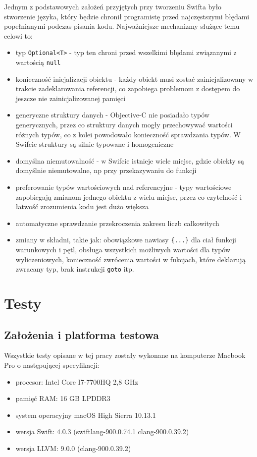 \documentclass[mgr, shortabstract]{iithesis}
\begin{document}
Jednym z podstawowych założeń przyjętych przy tworzeniu Swifta było stworzenie języka, który będzie chronił programistę przed najczęstszymi błędami popełnianymi podczas pisania kodu. Najważniejsze mechanizmy służące temu celowi to:

\begin{itemize}
    \item typ \texttt{Optional<T>} - typ ten chroni przed wszelkimi błędami związanymi z wartością \texttt{null}
    \item konieczność inicjalizacji obiektu - każdy obiekt musi zostać zainicjalizowany w trakcie zadeklarowania referencji, co zapobiega problemom z dostępem do jeszcze nie zainicjalizowanej pamięci
    \item generyczne struktury danych - Objective-C nie posiadało typów generycznych, przez co struktury danych mogły przechowywać wartości różnych typów, co z kolei powodowało konieczność sprawdzania typów. W Swifcie struktury są silnie typowane i homogeniczne
    \item domyślna niemutowalność - w Swifcie istnieje wiele miejsc, gdzie obiekty są domyślnie niemutowalne, np przy przekazywaniu do funkcji
    \item preferowanie typów wartościowych nad referencyjne - typy wartościowe zapobiegają zmianom jednego obiektu z wielu miejsc, przez co czytelność i łatwość zrozumienia kodu jest dużo większa
    \item automatyczne sprawdzanie przekroczenia zakresu liczb całkowitych
    \item zmiany w składni, takie jak: obowiązkowe nawiasy \texttt{\{...\}} dla ciał funkcji warunkowych i pętl, obsługa wszystkich możliwych wartości dla typów wyliczeniowych, konieczność zwrócenia wartości w fukcjach, które deklarują zwracany typ, brak instrukcji \texttt{goto} itp.
\end{itemize}

\chapter{Testy}

\section{Założenia i platforma testowa}

Wszystkie testy opisane w tej pracy zostały wykonane na komputerze Macbook Pro o następującej specyfikacji:

\begin{itemize}
    \item procesor: Intel Core I7-7700HQ 2,8 GHz
    \item pamięć RAM: 16 GB LPDDR3
    \item system operacyjny macOS High Sierra 10.13.1
    \item wersja Swift: 4.0.3 (swiftlang-900.0.74.1 clang-900.0.39.2)
    \item wersja LLVM: 9.0.0 (clang-900.0.39.2)
\end{itemize}
\end{document}
